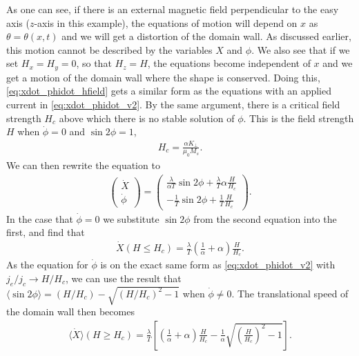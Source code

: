 \documentclass[12pt, a4paper, twoside, openright]{article}		%
\numberwithin{equation}{section}
\begin{document}
As one can see, if there is an external magnetic field perpendicular to the easy axis ($z$-axis in this example), the equations of motion will depend on $x$ as $\theta = \theta(x,t)$ and we will get a distortion of the domain wall. As discussed earlier, this motion cannot be described by the variables $X$ and $\phi$. We also see that if we set $H_x = H_y = 0$, so that $H_z = H$, the equations become independent of $x$ and we get a motion of the domain wall where the shape is conserved. Doing this, \eqref{eq:xdot_phidot_hfield} gets a similar form as the equations with an applied current in \eqref{eq:xdot_phidot_v2}. By the same argument, there is a critical field strength $H_c$ above which there is no stable solution of $\phi$. This is the field strength $H$ when $\dot{\phi}=0$ and $\sin2\phi=1$, 
\begin{align}
\label{eq:Hcrit}
H_c = \frac{\alpha K_{\perp}}{\mu_0 M_s}.
\end{align}
We can then rewrite the equation to
\begin{align}
\label{eq:xdot_phidot_hz}
\begin{pmatrix}
\dot{X} \\ \dot{\phi}
\end{pmatrix} = 
\begin{pmatrix}
\frac{\lambda}{\alpha T} \sin2\phi  + \frac{\lambda}{T} \alpha \frac{H}{H_c} \\
-\frac{1}{T}\sin2\phi + \frac{1}{T}\frac{H}{H_c}
\end{pmatrix}.
\end{align}
In the case that $\dot{\phi}=0$ we substitute $\sin2\phi$ from the second equation into the first, and find that
\begin{align}
\dot{X}(H\leq H_c) = \frac{\lambda}{T}\left(\frac{1}{\alpha}+\alpha\right) \frac{H}{H_c}.
\end{align}
As the equation for $\dot{\phi}$ is on the exact same form as \eqref{eq:xdot_phidot_v2} with $j_e/j_c \rightarrow H/H_c$, we can use the result that $\langle\sin2\phi\rangle = (H/H_c)- \sqrt{(H/H_c)^2-1}$ when $\dot{\phi} \neq 0$. The translational speed of the domain wall then becomes
\begin{align}
\langle\dot{X}\rangle (H\geq H_c) = \frac{\lambda}{T} \left[\left(\frac{1}{\alpha}+\alpha\right) \frac{H}{H_c} - \frac{1}{\alpha}\sqrt{\left(\frac{H}{H_c}\right)^2-1} \right].
\end{align}
\end{document}
